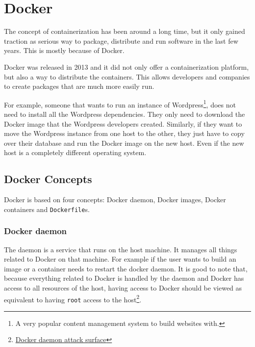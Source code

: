 \section{Docker}

\hfill

The concept of containerization has been around a long time, but it only gained traction as serious way to package, distribute and run software in the last few years. This is mostly because of Docker.

\hfill

Docker was released in 2013 and it did not only offer a containerization platform, but also a way to distribute the containers. This allows developers and companies to create packages that are much more easily run.

\hfill

For example, someone that wants to run an instance of Wordpress\footnote{A very popular content management system to build websites with.}, does not need to install all the Wordpress dependencies. They only need to download the Docker image that the Wordpress developers created.
Similarly, if they want to move the Wordpress instance from one host to the other, they just have to copy over their database and run the Docker image on the new host. Even if the new host is a completely different operating system.

\subsection{Docker Concepts}
Docker is based on four concepts: Docker daemon, Docker images, Docker containers and \lstinline{Dockerfile}s.

\subsubsection{Docker daemon}
The daemon is a service that runs on the host machine. It manages all things related to Docker on that machine. For example if the user wants to build an image or a container needs to restart the docker daemon. It is good to note that, because everything related to Docker is handled by the daemon and Docker has access to all resources of the host, having access to Docker should be viewed as equivalent to having \lstinline{root} access to the host\footnote{\href{https://docs.docker.com/engine/security/security/\#docker-daemon-attack-surface}{Docker daemon attack surface}}.

